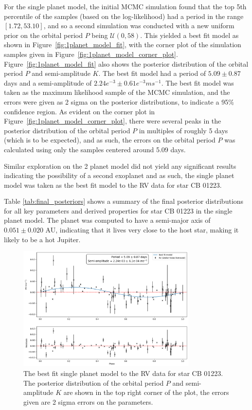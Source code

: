 For the single planet model, the initial MCMC simulation found that the top 5th percentile of the samples (based on the
log-likelihood) had a period in the range $[1.72, 53.10]$, and so a second simulation was conducted with a new uniform
prior on the orbital period $P$ being $\mathcal{U}(0, 58)$.
This yielded a best fit model as shown in Figure~\eqref{fig:1planet_model_fit}, with the corner plot of the simulation
samples given in Figure~\eqref{fig:1planet_model_corner_plot}.
Figure~\eqref{fig:1planet_model_fit} also shows the posterior distribution of the orbital period $P$ and semi-amplitude $K$.
The best fit model had a period of $5.09 \pm 0.87$ days and a semi-amplitude of $2.24e^{-3} \pm 0.61e^{-3} ms^{-1}$.
The best fit model was taken as the maximum likelihood sample of the MCMC simulation, and the errors were given
as 2 sigma on the posterior distributions, to indicate a 95\% confidence region.
As evident on the corner plot in Figure~\eqref{fig:1planet_model_corner_plot}, there were several peaks in the posterior
distribution of the orbital period $P$ in multiples of roughly 5 days (which is to be expected), and as such, the
errors on the orbital period $P$ was calculated using only the samples centered around 5.09 days.

Similar exploration on the 2 planet model did not yield any significant results indicating the possibility of a second
exoplanet and as such, the single planet model was taken as the best fit model to the RV data for star CB 01223.

Table \eqref{tab:final_posteriors} shows a summary of the final posterior distributions for all key parameters and derived
properties for star CB 01223 in the single planet model.
The planet was computed to have a semi-major axis of $0.051 \pm 0.020$ AU, indicating that it lives very close to the host star,
making it likely to be a hot Jupiter.

\begin{figure}[htb]
    \centering
    \includegraphics[width=0.8\textwidth]{figures/1planet_model_fit}
    \caption{The best fit single planet model to the RV data for star CB 01223.
    The posterior distribution of the orbital period $P$ and semi-amplitude $K$ are shown in the top right corner of the plot,
    the errors given are 2 sigma errors on the parameters.}
    \label{fig:1planet_model_fit}
\end{figure}


